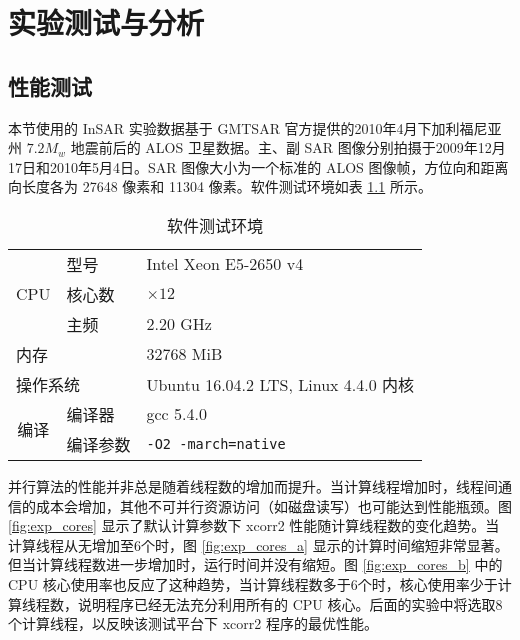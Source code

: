 \chapter{实验测试与分析}

\section{性能测试}

本节使用的 InSAR 实验数据基于 GMTSAR 官方提供的2010年4月下加利福尼亚州 $7.2 M_w$ 地震前后的 ALOS 卫星数据。主、副 SAR 图像分别拍摄于2009年12月17日和2010年5月4日。SAR 图像大小为一个标准的 ALOS 图像帧，方位向和距离向长度各为 27648 像素和 11304 像素。软件测试环境如表 \ref{tab:env} 所示。

\begin{table}[htbp]
\centering
\begin{tabular}{|l|l|l|}
\hline
    \multirow{3}{*}{CPU}                        & 型号     & Intel Xeon E5-2650 v4                 \\ \cline{2-3} 
                                                & 核心数   & $\times 12$                           \\ \cline{2-3} 
                                                & 主频     & 2.20 GHz                              \\ \hline
    \multicolumn{2}{|l|}{内存}                             & 32768 MiB                             \\ \hline
    \multicolumn{2}{|l|}{操作系统}                         & Ubuntu 16.04.2 LTS, Linux 4.4.0 内核  \\ \hline
    \multicolumn{1}{|c|}{\multirow{2}{*}{编译}} & 编译器   & gcc 5.4.0                             \\ \cline{2-3} 
    \multicolumn{1}{|c|}{}                      & 编译参数 & \texttt{-O2 -march=native}            \\ \hline
\end{tabular}
\caption{软件测试环境} \label{tab:env}
\end{table}

并行算法的性能并非总是随着线程数的增加而提升。当计算线程增加时，线程间通信的成本会增加，其他不可并行资源访问（如磁盘读写）也可能达到性能瓶颈。图 \ref{fig:exp_cores} 显示了默认计算参数下 xcorr2 性能随计算线程数的变化趋势。当计算线程从无增加至6个时，图 \ref{fig:exp_cores_a} 显示的计算时间缩短非常显著。但当计算线程数进一步增加时，运行时间并没有缩短。图 \ref{fig:exp_cores_b} 中的 CPU 核心使用率也反应了这种趋势，当计算线程数多于6个时，核心使用率少于计算线程数，说明程序已经无法充分利用所有的 CPU 核心。后面的实验中将选取8个计算线程，以反映该测试平台下 xcorr2 程序的最优性能。

